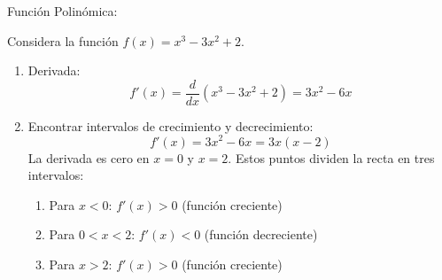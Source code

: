 \begin{example}
Función Polinómica:

Considera la función \( f(x) = x^3 - 3x^2 + 2 \).

\begin{enumerate}
    \item Derivada:
    \[
    f'(x) = \frac{d}{dx}(x^3 - 3x^2 + 2) = 3x^2 - 6x
    \]
    
    \item Encontrar intervalos de crecimiento y decrecimiento:
       \[
       f'(x) = 3x^2 - 6x = 3x(x - 2)
       \]
       La derivada es cero en \( x = 0 \) y \( x = 2 \). Estos puntos dividen la recta en tres intervalos:
       \begin{enumerate}
        \item Para \( x < 0 \): \( f'(x) > 0 \) (función creciente)
        \item Para \( 0 < x < 2 \): \( f'(x) < 0 \) (función decreciente)
        \item Para \( x > 2 \): \( f'(x) > 0 \) (función creciente)
       \end{enumerate}
\end{enumerate}
\end{example}




